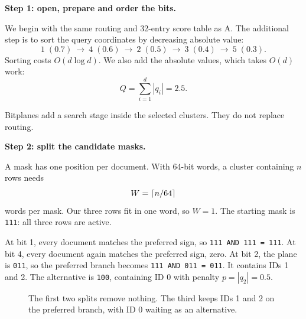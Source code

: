 \textbf{Step 1: open, prepare and order the bits.}\par
We begin with the same routing and 32-entry score table as A. The additional step is to sort the query coordinates by decreasing absolute value:
\[
 1\;(0.7)\ \to\ 4\;(0.6)\ \to\ 2\;(0.5)\ \to\ 3\;(0.4)\ \to\ 5\;(0.3).
\]
Sorting costs $O(d\log d)$. We also add the absolute values, which takes $O(d)$ work:
\[
 Q=\sum_{i=1}^{d}|q_i|=2.5.
\]
\begin{center}
\end{center}
Bitplanes add a search stage inside the selected clusters. They do not replace routing.

\textbf{Step 2: split the candidate masks.}\par
A mask has one position per document. With 64-bit words, a cluster containing $n$ rows needs
\[
 W=\left\lceil n/64\right\rceil
\]
words per mask. Our three rows fit in one word, so $W=1$. The starting mask is \texttt{111}: all three rows are active.

At bit 1, every document matches the preferred sign, so \texttt{111 AND 111 = 111}. At bit 4, every document again matches the preferred sign, zero. At bit 2, the plane is \texttt{011}, so the preferred branch becomes \texttt{111 AND 011 = 011}. It contains IDs 1 and 2. The alternative is \texttt{100}, containing ID 0 with penalty $p=|q_2|=0.5$.

\begin{figure}[htbp]\centering
{}
\caption{The first two splits remove nothing. The third keeps IDs 1 and 2 on the preferred branch, with ID 0 waiting as an alternative.}
\end{figure}

